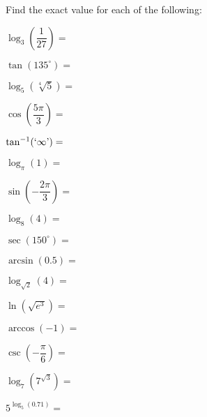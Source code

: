 \documentclass[12pt,letterpaper]{exam}
\newenvironment{2enumerate}{%
\begin{enumerate}[(a)]
\begin{multicols}{2}
}{%
\end{multicols}
\end{enumerate}
}
\begin{document}
\begin{questions}
Find the exact value for each of the following: \par\vspace{0.3cm}
	\begin{2enumerate}
	\item $\log_3 \!\left( \dfrac{1}{27} \right)=$ \par\vspace{1.8cm}
	\item $\tan(135^\circ)=$ \par\vspace{1.8cm}
	\item $\log_5 \left( \sqrt[4]{5} \right)=$ \par\vspace{1.8cm}
	\item $\cos \!\left( \dfrac{5\pi}{3} \right)=$ \par\vspace{1.8cm}
	\item $\tan^{-1}(`\infty\text{'})=$ \par\vspace{1.8cm}
	\item $\log_\pi (1)=$ \par\vspace{1.8cm}
	\item $\sin \!\left(-\dfrac{2\pi}{3} \right)=$ \par\vspace{1.8cm}
	\item $\log_8 (4)=$ \par\vspace{1.8cm}
	\item $\sec(150^\circ)=$ \par\vspace{1.8cm}
	\item $\arcsin(0.5)=$ \par\vspace{1.8cm}
	\item $\log_{\sqrt{2}} (4)=$ \par\vspace{1.8cm}
	\item $\ln(\sqrt{e^3})=$ \par\vspace{1.8cm}
	\item $\arccos(-1)=$ \par\vspace{1.8cm}
	\item $\csc \!\left( -\dfrac{\pi}{6} \right)=$ \par\vspace{1.8cm}
	\item $\log_7(7^{\sqrt{3}})=$ \par\vspace{1.8cm}
	\item $5^{\log_5(0.71)}=$ \par\vspace{1.8cm}
	\end{2enumerate}




\end{questions}
\end{document}
